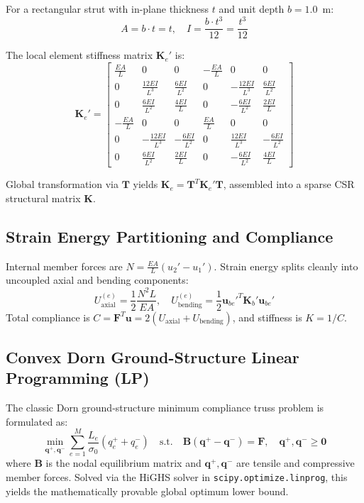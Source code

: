 \documentclass[10pt,journal,compsoc]{IEEEtran}
\begin{document}
For a rectangular strut with in-plane thickness $t$ and unit depth $b = 1.0$~m:
\begin{equation}
A = b \cdot t = t, \quad I = \frac{b \cdot t^3}{12} = \frac{t^3}{12}
\end{equation}

The local element stiffness matrix $\mathbf{K}_e'$ is:
\begin{equation}
\mathbf{K}_e' = \begin{bmatrix}
\frac{EA}{L} & 0 & 0 & -\frac{EA}{L} & 0 & 0 \\
0 & \frac{12EI}{L^3} & \frac{6EI}{L^2} & 0 & -\frac{12EI}{L^3} & \frac{6EI}{L^2} \\
0 & \frac{6EI}{L^2} & \frac{4EI}{L} & 0 & -\frac{6EI}{L^2} & \frac{2EI}{L} \\
-\frac{EA}{L} & 0 & 0 & \frac{EA}{L} & 0 & 0 \\
0 & -\frac{12EI}{L^3} & -\frac{6EI}{L^2} & 0 & \frac{12EI}{L^3} & -\frac{6EI}{L^2} \\
0 & \frac{6EI}{L^2} & \frac{2EI}{L} & 0 & -\frac{6EI}{L^2} & \frac{4EI}{L}
\end{bmatrix}
\end{equation}

Global transformation via $\mathbf{T}$ yields $\mathbf{K}_e = \mathbf{T}^T \mathbf{K}_e' \mathbf{T}$, assembled into a sparse CSR structural matrix $\mathbf{K}$.

\subsection{Strain Energy Partitioning and Compliance}
Internal member forces are $N = \frac{EA}{L}(u_2' - u_1')$. Strain energy splits cleanly into uncoupled axial and bending components:
\begin{equation}
U_{\text{axial}}^{(e)} = \frac{1}{2} \frac{N^2 L}{EA}, \quad U_{\text{bending}}^{(e)} = \frac{1}{2} \mathbf{u}_{be}'^T \mathbf{K}_b' \mathbf{u}_{be}'
\end{equation}
Total compliance is $C = \mathbf{F}^T \mathbf{u} = 2(U_{\text{axial}} + U_{\text{bending}})$, and stiffness is $K = 1/C$.

\subsection{Convex Dorn Ground-Structure Linear Programming (LP)}
The classic Dorn ground-structure minimum compliance truss problem \cite{dorn1964automatic, gilbert2003layout} is formulated as:
\begin{equation}
\min_{\mathbf{q}^+, \mathbf{q}^-} \sum_{e=1}^M \frac{L_e}{\sigma_0} (q_e^+ + q_e^-) \quad \text{s.t.} \quad \mathbf{B}(\mathbf{q}^+ - \mathbf{q}^-) = \mathbf{F}, \quad \mathbf{q}^+, \mathbf{q}^- \ge \mathbf{0}
\end{equation}
where $\mathbf{B}$ is the nodal equilibrium matrix and $\mathbf{q}^+, \mathbf{q}^-$ are tensile and compressive member forces. Solved via the HiGHS solver in \texttt{scipy.optimize.linprog}, this yields the mathematically provable global optimum lower bound.
\end{document}
